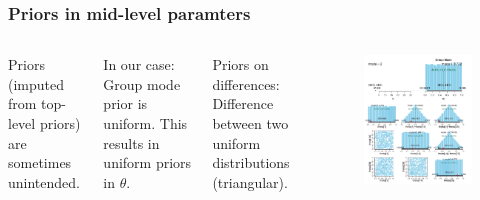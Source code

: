 \documentclass[usenames,dvipsnames,table]{beamer}
\begin{document}
\begin{frame}
\frametitle{Priors in mid-level paramters}
\begin{columns}[c]
Priors (imputed from top-level priors) are sometimes unintended.

\vspace{1em}
In our case: Group mode prior is uniform. This results in uniform priors in $\theta$.

\vspace{1em}
Priors on differences: Difference between two uniform distributions (triangular).
\begin{figure}
\centering
\includegraphics[width=\linewidth]{img/fig9_11}
\end{figure}
\end{columns}
\end{frame}
\end{document}
